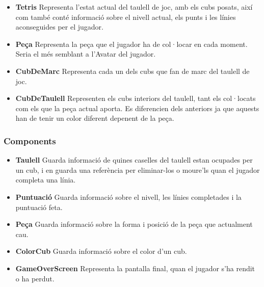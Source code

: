     \begin{itemize}
      \item {\bf Tetris}
        Representa l'estat actual del taulell de joc, amb els cubs posats, així com també conté informació sobre el nivell actual, els punts i les línies aconseguides per el jugador.
        
      \item {\bf Peça}
        Representa la peça que el jugador ha de col·locar en cada moment. Seria el més semblant a l'Avatar del jugador.
        
      \item {\bf CubDeMarc}
        Representa cada un dels cubs que fan de marc del taulell de joc.
        
      \item {\bf CubDeTaulell}
        Representen els cubs interiors del taulell, tant els col·locats com els que la peça actual aporta. Es diferencien dels anteriors ja que aquests han de tenir un color diferent depenent de la peça.
        
    \end{itemize}

  \subsubsection{Components}

    \begin{itemize}
      \item {\bf Taulell}
        Guarda informació de quines caselles del taulell estan ocupades per un cub, i en guarda una referència per eliminar-los o moure'ls quan el jugador completa una línia.
        
      \item {\bf Puntuació}
        Guarda informació sobre el nivell, les línies completades i la puntuació feta.
        
      \item {\bf Peça}
        Guarda informació sobre la forma i posició de la peça que actualment cau.
        
      \item {\bf ColorCub}
        Guarda informació sobre el color d'un cub.
        
      \item {\bf GameOverScreen}
        Representa la pantalla final, quan el jugador s'ha rendit o ha perdut.
        
    \end{itemize}

